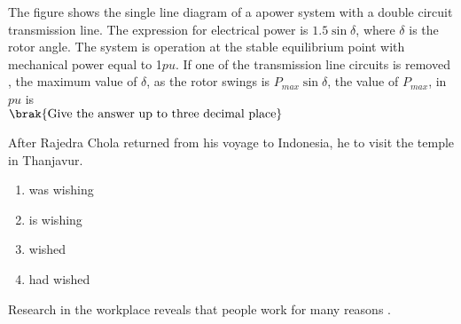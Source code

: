         \hfill{}

    \item The figure shows the single line diagram of a apower system with a double circuit 
        transmission line. The expression for electrical power is $1.5 \sin \delta$, where
        $\delta$ is the rotor angle. The system is operation at the stable equilibrium point
        with mechanical power equal to 1$pu$. If one of the transmission line circuits is removed
        , the maximum value of $\delta$, as the rotor swings is $P_{max} \sin \delta$, the value
        of $P_{max}$, in $pu$ is \\
        $\brak{\textnormal{Give the answer up to three decimal place}}$

        \hfill{}
        \begin{center}
        \end{center}
    \item After Rajedra Chola returned from his voyage to Indonesia, he  to visit
        the temple in Thanjavur.
        \hfill{}
        \begin{multicols}{4}
            \begin{enumerate}
                \item was wishing
                    \columnbreak
                \item is wishing
                    \columnbreak
                \item wished
                    \columnbreak
                \item had wished
            \end{enumerate}
        \end{multicols}
    \item Research in the workplace reveals that people work for many reasons .		
        \hfill{}

